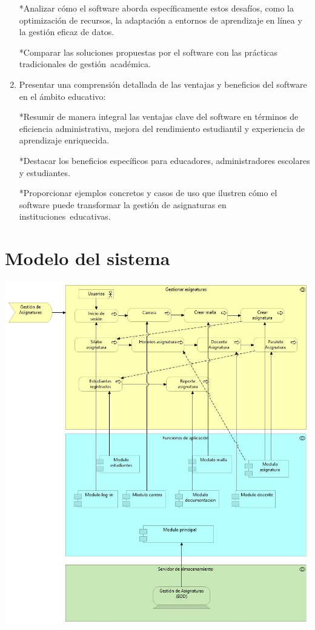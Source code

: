\documentclass[11pt]{article}
\begin{document}
\begin{enumerate}
*Analizar cómo el software aborda específicamente estos
desafíos, como la optimización de recursos, la
adaptación a entornos de
aprendizaje en línea y la gestión eficaz de datos.

*Comparar las soluciones propuestas por el software con
las prácticas tradicionales de gestión académica.

\item Presentar una comprensión detallada de las
ventajas y beneficios del software en el ámbito
educativo:

*Resumir de manera integral las ventajas clave del
software en términos de eficiencia administrativa,
mejora del rendimiento estudiantil y experiencia de
aprendizaje enriquecida.


*Destacar los beneficios específicos para educadores,
administradores escolares y estudiantes.


*Proporcionar ejemplos concretos y casos de uso que
ilustren cómo el software puede transformar la gestión
de asignaturas en
instituciones educativas. 
\end{enumerate}
\section{Modelo del sistema}
\includegraphics[scale=0.55]{ModelG.A.jpg}
\end{document}
